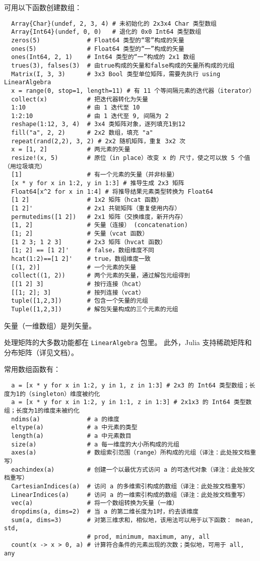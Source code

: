 \documentclass[10pt,a4paper]{article}
\begin{document}
可用以下函数创建数组：
\begin{lstlisting}
  Array{Char}(undef, 2, 3, 4) # 未初始化的 2x3x4 Char 类型数组
  Array{Int64}(undef, 0, 0)   # 退化的 0x0 Int64 类型数组
  zeros(5)             # Float64 类型的“零”构成的矢量
  ones(5)              # Float64 类型的“一”构成的矢量
  ones(Int64, 2, 1)    # Int64 类型的“一”构成的 2x1 数组
  trues(3), falses(3)  # 由true构成的矢量和false构成的矢量所构成的元组
  Matrix(I, 3, 3)      # 3x3 Bool 类型单位矩阵，需要先执行 using LinearAlgebra
  x = range(0, stop=1, length=11) # 有 11 个等间隔元素的迭代器（iterator）
  collect(x)           # 把迭代器转化为矢量
  1:10                 # 由 1 迭代至 10
  1:2:10               # 由 1 迭代至 9, 间隔为 2
  reshape(1:12, 3, 4)  # 3x4 类矩阵对象，逐列填充1到12
  fill("a", 2, 2)      # 2x2 数组，填充 "a"
  repeat(rand(2,2), 3, 2) # 2x2 随机矩阵，重复 3x2 次
  x = [1, 2]           # 两元素的矢量
  resize!(x, 5)        # 原位（in place）改变 x 的 尺寸，使之可以放 5 个值（用垃圾填充）
  [1]                  # 有一个元素的矢量（并非标量）
  [x * y for x in 1:2, y in 1:3] # 推导生成 2x3 矩阵
  Float64[x^2 for x in 1:4] # 将推导结果元素类型转换为 Float64
  [1 2]                # 1x2 矩阵（hcat 函数）
  [1 2]'               # 2x1 共轭矩阵（重复使用内存）
  permutedims([1 2])   # 2x1 矩阵（交换维度，新开内存）
  [1, 2]               # 矢量（连接） (concatenation)
  [1; 2]               # 矢量（vcat 函数）
  [1 2 3; 1 2 3]       # 2x3 矩阵（hvcat 函数）
  [1; 2] == [1 2]'     # false，数组维度不同
  hcat(1:2)==[1 2]'    # true，数组维度一致
  [(1, 2)]             # 一个元素的矢量
  collect((1, 2))      # 两个元素的矢量，通过解包元组得到
  [[1 2] 3]            # 按行连接（hcat）
  [[1; 2]; 3]          # 按列连接（vcat）
  tuple([1,2,3])       # 包含一个矢量的元组
  Tuple([1,2,3])       # 解包矢量构成的三个元素的元组
\end{lstlisting}
矢量（一维数组）是列矢量。

处理矩阵的大多数功能都在 \lstinline|LinearAlgebra| 包里。
此外，Julia 支持稀疏矩阵和分布矩阵（详见文档）。

常用数组函数有：
\begin{lstlisting}
  a = [x * y for x in 1:2, y in 1, z in 1:3] # 2x3 的 Int64 类型数组；长度为1的（singleton）维度被约化
  a = [x * y for x in 1:2, y in 1:1, z in 1:3] # 2x1x3 的 Int64 类型数组；长度为1的维度未被约化
  ndims(a)             # a 的维度
  eltype(a)            # a 中元素的类型
  length(a)            # a 中元素数目
  size(a)              # a 每一维度的大小所构成的元组
  axes(a)              # 数组索引范围（range）所构成的元组（译注：此处按文档重写）
  eachindex(a)         # 创建一个以最优方式访问 a 的可迭代对象（译注：此处按文档重写）
  CartesianIndices(a)  # 访问 a 的多维索引构成的数组（译注：此处按文档重写）
  LinearIndices(a)     # 访问 a 的一维索引构成的数组（译注：此处按文档重写）
  vec(a)               # 将一个数组转换为矢量（一维）
  dropdims(a, dims=2)  # 当 a 的第二维长度为1时，约去该维度
  sum(a, dims=3)       # 对第三维求和，相似地，该用法可以用于以下函数： mean, std,
                       # prod, minimum, maximum, any, all
  count(x -> x > 0, a) # 计算符合条件的元素出现的次数；类似地，可用于 all, any
\end{lstlisting}
\end{document}
